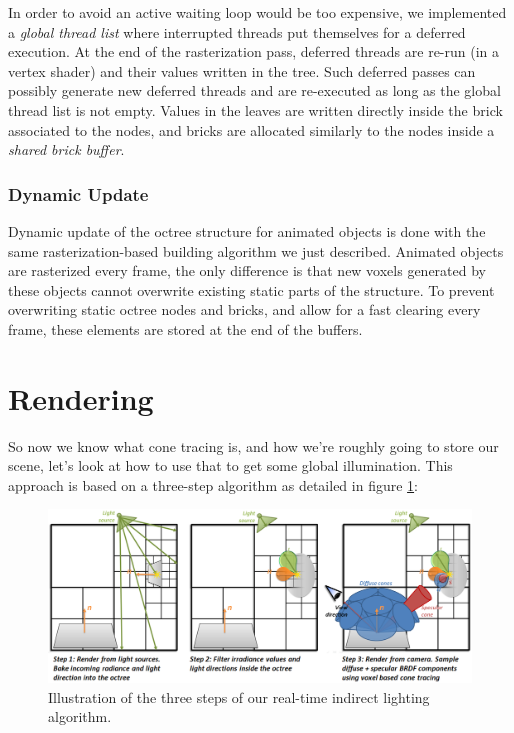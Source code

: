 In order to avoid an active waiting loop would be too expensive, we implemented a \textit{global thread list} where interrupted threads put themselves for a deferred execution. At the end of the rasterization pass, deferred threads are re-run (in a vertex shader) and their values written in the tree. Such deferred passes can possibly generate new deferred threads and are re-executed as long as the global thread list is not empty. Values in the leaves are written directly inside the brick associated to the nodes, and bricks are allocated similarly to the nodes inside a \textit{shared brick buffer}. 




\subsubsection{Dynamic Update}
Dynamic update of the octree structure for animated objects is done with the same rasterization-based building algorithm we just described. Animated objects are rasterized every frame, the only difference is that new voxels generated by these objects cannot overwrite existing static parts of the structure. To prevent overwriting static octree nodes and bricks, and allow for a fast clearing every frame, these elements are stored at the end of the buffers.





\section{Rendering}
So now we know what cone tracing is, and how we're roughly going to store our scene, let's look at how to use that to get some global illumination. This approach is based on a three-step algorithm as detailed in figure \ref{f:vct-steps}:

\begin{figure}
	\includegraphics[width=1.0\textwidth]{graphics/vct/vct-3}
	\caption{Illustration of the three steps of our real-time indirect lighting algorithm.}
	\label{f:vct-steps}
\end{figure}

